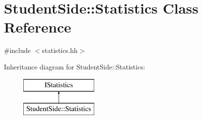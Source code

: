 \hypertarget{class_student_side_1_1_statistics}{\section{Student\-Side\-:\-:Statistics Class Reference}
\label{class_student_side_1_1_statistics}
}


{\ttfamily \#include $<$statistics.\-hh$>$}

Inheritance diagram for Student\-Side\-:\-:Statistics\-:\begin{figure}[H]
\begin{center}
\leavevmode
\includegraphics[height=2.000000cm]{class_student_side_1_1_statistics}
\end{center}
\end{figure}
